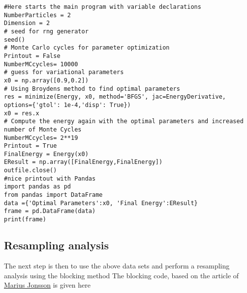 \documentclass[%
oneside,                 %
final,                   %
10pt]{article}
\begin{document}
\begin{verbatim}
#Here starts the main program with variable declarations
NumberParticles = 2
Dimension = 2
# seed for rng generator 
seed()
# Monte Carlo cycles for parameter optimization
Printout = False
NumberMCcycles= 10000
# guess for variational parameters
x0 = np.array([0.9,0.2])
# Using Broydens method to find optimal parameters
res = minimize(Energy, x0, method='BFGS', jac=EnergyDerivative, options={'gtol': 1e-4,'disp': True})
x0 = res.x
# Compute the energy again with the optimal parameters and increased number of Monte Cycles
NumberMCcycles= 2**19
Printout = True
FinalEnergy = Energy(x0)
EResult = np.array([FinalEnergy,FinalEnergy])
outfile.close()
#nice printout with Pandas
import pandas as pd
from pandas import DataFrame
data ={'Optimal Parameters':x0, 'Final Energy':EResult}
frame = pd.DataFrame(data)
print(frame)

\end{verbatim}


\subsection*{Resampling analysis}

The next step is then to use the above data sets and perform a
resampling analysis using the blocking method
The blocking code, based on the article of \href{{https://journals.aps.org/pre/abstract/10.1103/PhysRevE.98.043304}}{Marius Jonsson} is given here
\end{document}
